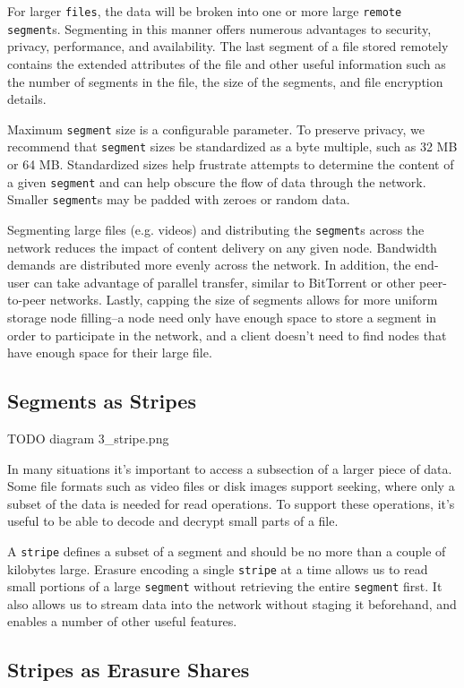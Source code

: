 \documentclass[11pt,fleqn,openany]{book}
\newcommand{\x}[1]{{\tt #1}} \newcommand{\code}[1]{{\em #1}}
\newcommand{\todo}[1]{{\color{red} TODO #1 }}
\begin{document}
For larger \x{files}, the data will be broken
into one or more large \x{remote segment}s. Segmenting in this manner offers
numerous advantages to security, privacy, performance, and availability. The
last segment of a file stored remotely contains the extended attributes of
the file and other useful information such as the number of segments in the
file, the size of the segments, and file encryption details.

Maximum \x{segment} size is a configurable parameter. To preserve privacy, we
recommend that \x{segment} sizes be standardized as a byte multiple, such as
32 MB or 64 MB.
Standardized sizes help frustrate attempts to determine the content of a given
\x{segment} and can help obscure the flow of data through the network.
Smaller \x{segment}s may be padded with zeroes or random data.

Segmenting large files (e.g. videos) and distributing the \x{segment}s
across the network reduces the impact of content delivery on any
given node.
Bandwidth demands are distributed more evenly across the network.
In addition, the end-user can take advantage of parallel transfer, similar to
BitTorrent or other peer-to-peer networks. Lastly, capping the size of segments
allows for more uniform storage node filling--a node need only have enough
space to store a segment in order to participate in the network,
and a client doesn't need
to find nodes that have enough space for their large file.

\subsection{Segments as Stripes}

\todo{diagram 3\_stripe.png}

In many situations it's important to access a subsection of a larger piece of
data. Some file formats such as video files or disk images support seeking,
where only a subset of the data is needed for read operations.
To support these operations,
it's useful to be able to decode and decrypt small parts of a file.

A \x{stripe} defines a subset of a segment and should be no more than a
couple of kilobytes large. Erasure encoding
a single \x{stripe} at a time allows us to read small portions of a
large \x{segment} without retrieving the entire \x{segment} first.
It also allows us to stream data into the
network without staging it beforehand, and enables a number of other useful
features.

\subsection{Stripes as Erasure Shares}
\end{document}
